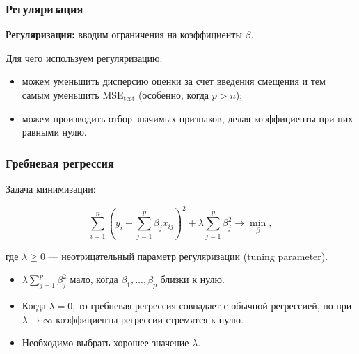 \documentclass[unicode, notheorems]{beamer}
\begin{document}
\begin{frame}
\frametitle{Регуляризация}

\textbf{Регуляризация:} вводим ограничения на коэффициенты $\beta$.

\vspace{0.8cm}
Для чего используем регуляризацию:
\begin{itemize}
\item можем уменьшить дисперсию оценки за счет введения смещения и тем самым уменьшить $\mathrm{MSE}_{\mathrm{test}}$ (особенно, когда $p >n$);
\item можем производить отбор значимых признаков, делая коэффициенты при них равными нулю.
\end{itemize}


\end{frame}


\begin{frame}
\frametitle{Гребневая регрессия}

Задача минимизации:

\[\sum_{i=1}^n(y_i - \sum_{j=1}^p \beta_j x_{ij})^2  + \lambda \sum_{j = 1}^p \beta_j^2 \rightarrow \min_{\beta},\]

где $\lambda \geq 0$ --- неотрицательный параметр регуляризации (tuning parameter).

\begin{itemize}
\item $\lambda\sum_{j = 1}^p \beta_j^2$ мало, когда $\beta_1, \ldots, \beta_p$ близки к нулю.
\item Когда $\lambda = 0$, то гребневая регрессия совпадает с обычной регрессией, но при $\lambda \rightarrow \infty$ коэффициенты регрессии стремятся к нулю.

\item Необходимо выбрать хорошее значение $\lambda$.
\end{itemize}











\end{frame}
\end{document}
